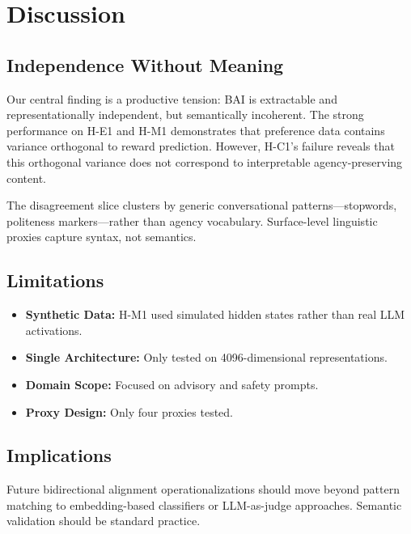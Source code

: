 \section{Discussion}

\subsection{Independence Without Meaning}

Our central finding is a productive tension: BAI is extractable and representationally independent, but semantically incoherent. The strong performance on H-E1 and H-M1 demonstrates that preference data contains variance orthogonal to reward prediction. However, H-C1's failure reveals that this orthogonal variance does not correspond to interpretable agency-preserving content.

The disagreement slice clusters by generic conversational patterns---stopwords, politeness markers---rather than agency vocabulary. Surface-level linguistic proxies capture syntax, not semantics.

\subsection{Limitations}

\begin{itemize}
    \item \textbf{Synthetic Data:} H-M1 used simulated hidden states rather than real LLM activations.
    \item \textbf{Single Architecture:} Only tested on 4096-dimensional representations.
    \item \textbf{Domain Scope:} Focused on advisory and safety prompts.
    \item \textbf{Proxy Design:} Only four proxies tested.
\end{itemize}

\subsection{Implications}

Future bidirectional alignment operationalizations should move beyond pattern matching to embedding-based classifiers or LLM-as-judge approaches. Semantic validation should be standard practice.
